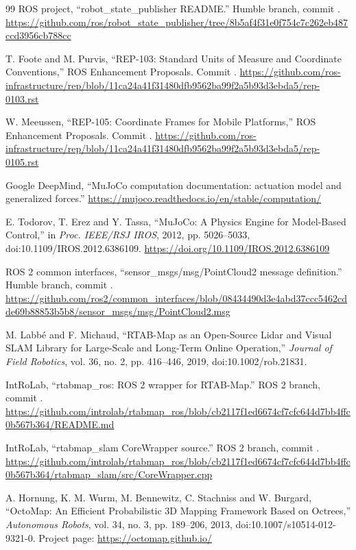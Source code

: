 \documentclass[11pt,a4paper]{article}
\begin{document}
\begin{thebibliography}{99}
ROS project, ``robot\_state\_publisher README.''
Humble branch, commit .
\url{https://github.com/ros/robot_state_publisher/tree/8b5af4f31e0f754c7c262eb487ccd3956cb788cc}

T. Foote and M. Purvis, ``REP-103: Standard Units of Measure and Coordinate
Conventions,'' ROS Enhancement Proposals.
Commit .
\url{https://github.com/ros-infrastructure/rep/blob/11ca24a41f31480dfb9562ba99f2a5b93d3ebda5/rep-0103.rst}

W. Meeussen, ``REP-105: Coordinate Frames for Mobile Platforms,'' ROS
Enhancement Proposals.
Commit .
\url{https://github.com/ros-infrastructure/rep/blob/11ca24a41f31480dfb9562ba99f2a5b93d3ebda5/rep-0105.rst}

Google DeepMind, ``MuJoCo computation documentation: actuation model and
generalized forces.''
\url{https://mujoco.readthedocs.io/en/stable/computation/}

E. Todorov, T. Erez and Y. Tassa, ``MuJoCo: A Physics Engine for Model-Based
Control,'' in \emph{Proc. IEEE/RSJ IROS}, 2012, pp. 5026--5033,
doi:10.1109/IROS.2012.6386109.
\url{https://doi.org/10.1109/IROS.2012.6386109}

ROS 2 common interfaces, ``sensor\_msgs/msg/PointCloud2 message definition.''
Humble branch, commit .
\url{https://github.com/ros2/common_interfaces/blob/08434490d3e4abd37ccc5462cdde69b88853b5b8/sensor_msgs/msg/PointCloud2.msg}

M. Labb\'e and F. Michaud, ``RTAB-Map as an Open-Source Lidar and Visual SLAM
Library for Large-Scale and Long-Term Online Operation,'' \emph{Journal of
Field Robotics}, vol. 36, no. 2, pp. 416--446, 2019,
doi:10.1002/rob.21831.

IntRoLab, ``rtabmap\_ros: ROS 2 wrapper for RTAB-Map.''
ROS 2 branch, commit .
\url{https://github.com/introlab/rtabmap_ros/blob/cb2117f1ed6674cf7cfc644d7bb4ffc0b567b364/README.md}

IntRoLab, ``rtabmap\_slam CoreWrapper source.''
ROS 2 branch, commit .
\url{https://github.com/introlab/rtabmap_ros/blob/cb2117f1ed6674cf7cfc644d7bb4ffc0b567b364/rtabmap_slam/src/CoreWrapper.cpp}

A. Hornung, K. M. Wurm, M. Bennewitz, C. Stachniss and W. Burgard,
``OctoMap: An Efficient Probabilistic 3D Mapping Framework Based on Octrees,''
\emph{Autonomous Robots}, vol. 34, no. 3, pp. 189--206, 2013,
doi:10.1007/s10514-012-9321-0. Project page:
\url{https://octomap.github.io/}


\end{thebibliography}
\end{document}
